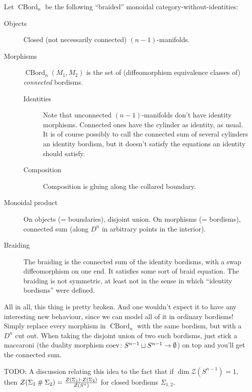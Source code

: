 \documentclass[a4paper]{article}
\begin{document}
\begin{definition}
	Let $\operatorname{CBord}_n$ be the following ``braided'' monoidal category-without-identities:
	\begin{description}
		\item[Objects]
			Closed (not necessarily connected) $(n-1)$-manifolds.
		\item[Morphisms]
			$\operatorname{CBord}_n(M_1, M_2)$ is the set of (diffeomorphism equivalence classes of) \emph{connected} bordisms.
			\begin{description}
				\item[Identities]
					Note that unconnected $(n-1)$-manifolds don't have identity morphisms.
					Connected ones have the cylinder as identity, as usual.
					It is of course possibly to call the connected sum of several cylinders an identity bordism,
					but it doesn't satisfy the equations an identity should satisfy.
				\item[Composition]
					Composition is gluing along the collared boundary.
			\end{description}
		\item[Monoidal product]
			On objects (= boundaries), disjoint union.
			On morphisms (= bordisms), connected sum (along $D^n$ in arbitrary points in the interior).
		\item[Braiding]
			The braiding is the connected sum of the identity bordisms,
			with a swap diffeomorphism on one end.
			It satisfies some sort of braid equation.
			The braiding is not symmetric, at least not in the sense in which ``identity bordisms'' were defined.
	\end{description}
\end{definition}
All in all, this thing is pretty broken.
And one wouldn't expect it to have any interesting new behaviour,
since we can model all of it in ordinary bordisms!
Simply replace every morphism in $\operatorname{CBord}_n$ with the same bordism,
but with a $D^n$ cut out.
When taking the disjoint union of two such bordisms,
just stick a maccaroni (the duality morphism $\operatorname{coev}\colon S^{n-1} \sqcup S^{n-1} \to \emptyset$) on top and you'll get the connected sum.

\medskip

TODO: A discussion relating this idea to the fact that if $\dim \mathcal{Z}(S^{n-1}) = 1$,
then $\mathcal{Z}(\Sigma_1 \mathbin{\#} \Sigma_2) = \frac{\mathcal{Z}(\Sigma_1) \cdot \mathcal{Z}(\Sigma_2)}{\mathcal{Z}(S^n)}$ for closed bordisms $\Sigma_{1,2}$.
\end{document}
